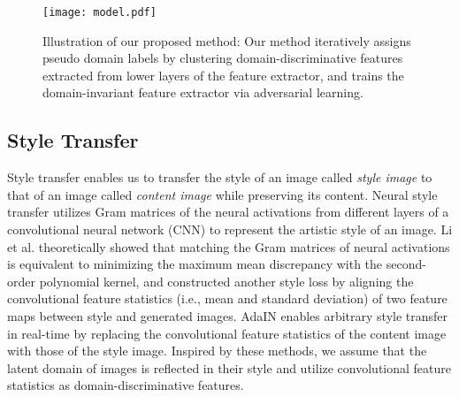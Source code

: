 \documentclass[letterpaper]{article} \usepackage{aaai20}  \usepackage{times}  \usepackage{helvet} \usepackage{courier}  \usepackage[hyphens]{url}  \usepackage{graphicx} \urlstyle{rm} \def\UrlFont{\rm}  \usepackage{graphicx}  \usepackage[whole]{bxcjkjatype}
\begin{document}
\begin{figure*}[t]
\centering
\texttt{[image: model.pdf]}
\caption{Illustration of our proposed method: Our method iteratively assigns pseudo domain labels by clustering domain-discriminative features extracted from lower layers of the feature extractor, and trains the domain-invariant feature extractor via adversarial learning.}
\label{fig:model}
\end{figure*}

\subsection{Style Transfer}
Style transfer enables us to transfer the style of an image called \textit{style image} to that of an image called \textit{content image} while preserving its content. Neural style transfer \cite{Gatys} utilizes Gram matrices of the neural activations from different layers of a convolutional neural network (CNN) to represent the artistic style of an image. Li et al. \cite{Li} theoretically showed that matching the Gram matrices of neural activations is equivalent to minimizing the maximum mean discrepancy with the second-order polynomial kernel, and constructed another style loss by aligning the convolutional feature statistics (i.e., mean and standard deviation) of two feature maps between style and generated images.
AdaIN \cite{AdaIN} enables arbitrary style transfer in real-time by replacing the convolutional feature statistics of the content image with those of the style image.
Inspired by these methods, we assume that the latent domain of images is reflected in their style and utilize convolutional feature statistics as domain-discriminative features.
\end{document}
